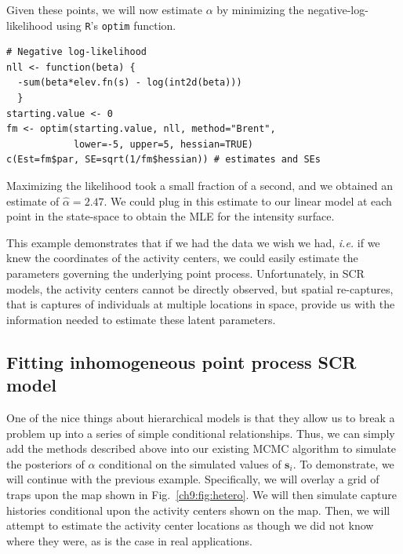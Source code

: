 Given these points, we will now estimate $\alpha$ by minimizing the
negative-log-likelihood using \verb+R+'s \verb+optim+ function.

\begin{small}
\begin{verbatim}
# Negative log-likelihood
nll <- function(beta) {
  -sum(beta*elev.fn(s) - log(int2d(beta)))
  }
starting.value <- 0
fm <- optim(starting.value, nll, method="Brent",
            lower=-5, upper=5, hessian=TRUE)
c(Est=fm$par, SE=sqrt(1/fm$hessian)) # estimates and SEs
\end{verbatim}
\end{small}


Maximizing the likelihood took a small fraction of a second, and we
obtained an estimate of $\hat{\alpha}=2.47$. We could plug in
this estimate to our linear model at each point in the state-space to
obtain the MLE for the intensity surface.

This example demonstrates
that if we had the data we wish we had, {\it i.e.} if we knew the
coordinates of the activity centers, we could easily estimate the
parameters governing the underlying point process. Unfortunately, in
SCR models, the activity centers cannot be directly observed, but
spatial re-captures, that is captures of individuals at
multiple locations in space, provide us with the information needed to
estimate these latent parameters.

\subsection{Fitting inhomogeneous point process SCR model}

One of the nice things about hierarchical models is that they allow us
to break a problem up into a series of simple conditional
relationships. Thus,
we can simply add the methods described above into our existing MCMC
algorithm to simulate the posteriors of $\alpha$ conditional on the
simulated values of $\mathbf{s}_i$. To demonstrate, we will continue with
the previous example. Specifically, we will overlay a grid of
traps upon the map shown in Fig.~\ref{ch9:fig:hetero}. We will then
simulate capture histories conditional upon the activity centers shown
on the map. Then, we will attempt to estimate the activity center
locations as though we did not know where they were, as is the case in
real applications.

